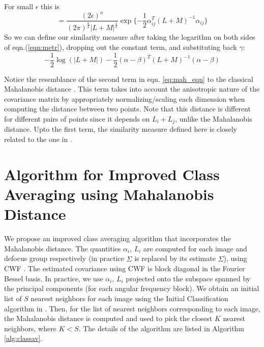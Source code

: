 \documentclass{article}
\begin{document}
For small $\epsilon$ this is
\begin{equation}
= \frac{(2 \epsilon)^n}{(2 \pi)^{\frac{n}{2}} |L + M|^{\frac{1}{2}}} \exp\{-\frac{1}{2}\alpha_{ij}^T(L+M)^{-1}\alpha_{ij}\} 
\label{eqn:metr}
\end{equation}
So we can define our similarity measure after taking the logarithm on both sides of eqn.(\ref{eqn:metr}), dropping out the constant term, and substituting back $\gamma$:
\begin{equation}\label{eq:mah_eqn}
 -\frac{1}{2}\log(|L + M|) -\frac{1}{2}(\alpha - \beta)^T(L+M)^{-1}(\alpha -\beta)
\end{equation}

Notice the resemblance of the second term in eqn. \ref{eq:mah_eqn} to the classical Mahalanobis distance \cite{mah}. This term takes into account the anisotropic nature of the covariance matrix by appropriately normalizing/scaling each dimension when computing the distance between two points. Note that this distance is different for different pairs of points since it depends on $L_i + L_j$, unlike the Mahalanobis distance. Upto the first term, the similarity measure defined here is closely related to the one in \cite{nlica}. 

\section{Algorithm for Improved Class Averaging using Mahalanobis Distance}

We propose an improved class averaging algorithm that incorporates the Mahalanobis distance. The quantities $\alpha_i$, $L_i$ are computed for each image and defocus group respectively (in practice $\Sigma$ is replaced by its estimate $\hat{\Sigma}$), using CWF \cite{cwf}. The estimated covariance using CWF is block diagonal in the Fourier Bessel basis. In practice, we use $\alpha_i$, $L_i$ projected onto the subspace spanned by the principal components (for each angular frequency block). We obtain an initial list of $S$ nearest neighbors for each image using the Initial Classification algorithm in \cite{zhao}. Then, for the list of nearest neighbors corresponding to each image, the Mahalanobis distance is computed and used to pick the closest $K$ nearest neighbors, where $K<S$. The details of the algorithm are listed in Algorithm \ref{alg:classav}. 
\end{document}
